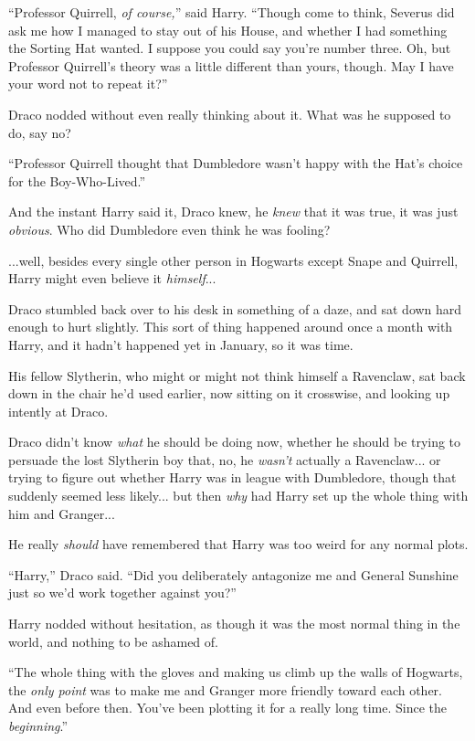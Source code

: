 ``Professor Quirrell, \emph{of course,}'' said Harry. ``Though come to think, Severus did ask me how I managed to stay out of his House, and whether I had something the Sorting Hat wanted. I suppose you could say you're number three. Oh, but Professor Quirrell's theory was a little different than yours, though. May I have your word not to repeat it?''

Draco nodded without even really thinking about it. What was he supposed to do, say no?

``Professor Quirrell thought that Dumbledore wasn't happy with the Hat's choice for the Boy-Who-Lived.''

And the instant Harry said it, Draco knew, he \emph{knew} that it was true, it was just \emph{obvious}. Who did Dumbledore even think he was fooling?

...well, besides every single other person in Hogwarts except Snape and Quirrell, Harry might even believe it \emph{himself}...

Draco stumbled back over to his desk in something of a daze, and sat down hard enough to hurt slightly. This sort of thing happened around once a month with Harry, and it hadn't happened yet in January, so it was time.

His fellow Slytherin, who might or might not think himself a Ravenclaw, sat back down in the chair he'd used earlier, now sitting on it crosswise, and looking up intently at Draco.

Draco didn't know \emph{what} he should be doing now, whether he should be trying to persuade the lost Slytherin boy that, no, he \emph{wasn't} actually a Ravenclaw... or trying to figure out whether Harry was in league with Dumbledore, though that suddenly seemed less likely... but then \emph{why} had Harry set up the whole thing with him and Granger...

He really \emph{should} have remembered that Harry was too weird for any normal plots.

``Harry,'' Draco said. ``Did you deliberately antagonize me and General Sunshine just so we'd work together against you?''

Harry nodded without hesitation, as though it was the most normal thing in the world, and nothing to be ashamed of.

``The whole thing with the gloves and making us climb up the walls of Hogwarts, the \emph{only point} was to make me and Granger more friendly toward each other. And even before then. You've been plotting it for a really long time. Since the \emph{beginning}.''

